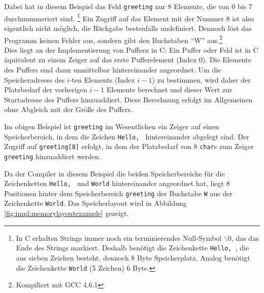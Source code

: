 Dabei hat in diesem Beispiel das Feld \lstinline+greeting+ nur 8 Elemente, die von 0 bis 7 durchnummeriert sind.%
\footnote{In C erhalten Strings immer noch ein terminierendes Null-Symbol $\backslash$0, das das Ende des Strings markiert. Deshalb benötigt die Zeichenkette \lstinline+Hello, +, die aus sieben Zeichen besteht, dennoch 8 Byte Speicherplatz. Analog benötigt die Zeichenkette \lstinline+World+ (5 Zeichen) 6 Byte.}
Ein Zugriff auf das Element mit der Nummer 8 ist also eigentlich nicht möglich, die Rückgabe bestenfalls undefiniert.
Dennoch löst das Programm keinen Fehler aus, sondern gibt den Buchstaben "`W"' aus.\footnote{Kompiliert mit GCC 4.6.1}\\

Dies liegt an der Implementierung von Puffern in C:
Ein Puffer oder Feld ist in C äquivalent zu einem Zeiger auf das erste Pufferelement (Index 0).
Die Elemente des Puffers sind dann unmittelbar hintereinander angeordnet.
Um die Speicheradresse des $i$-ten Elements (Index $i - 1$) zu bestimmen, wird daher der Platzbedarf der vorherigen $i-1$ Elemente berechnet und dieser Wert zur Startadresse des Puffers hinzuaddiert.
Diese Berechnung erfolgt im Allgemeinen ohne Abgleich mit der Größe des Puffers.

Im obigen Beispiel ist \lstinline+greeting+ im Wesentlichen ein Zeiger auf einen Speicherbereich, in dem die Zeichen \lstinline+Hello, + hintereinander abgelegt sind.
Der Zugriff auf \lstinline+greeting[8]+ erfolgt, in dem der Platzbedarf von 8 \lstinline+char+s zum Zeiger \lstinline+greeting+ hinzuaddiert werden.

Da der Compiler in diesem Beispiel die beiden Speicherbereiche für die Zeichenketten \lstinline+Hello, + und \lstinline+World+ hintereinander angeordnet hat,
liegt 8 Positionen hinter dem Speicherbereich \lstinline+greeting+ der Buchstabe \lstinline+W+ aus der Zeichenkette \lstinline+World+.
Das Speicherlayout wird in Abbildung \ref{fig:impl:memorylayoutexample} gezeigt.

